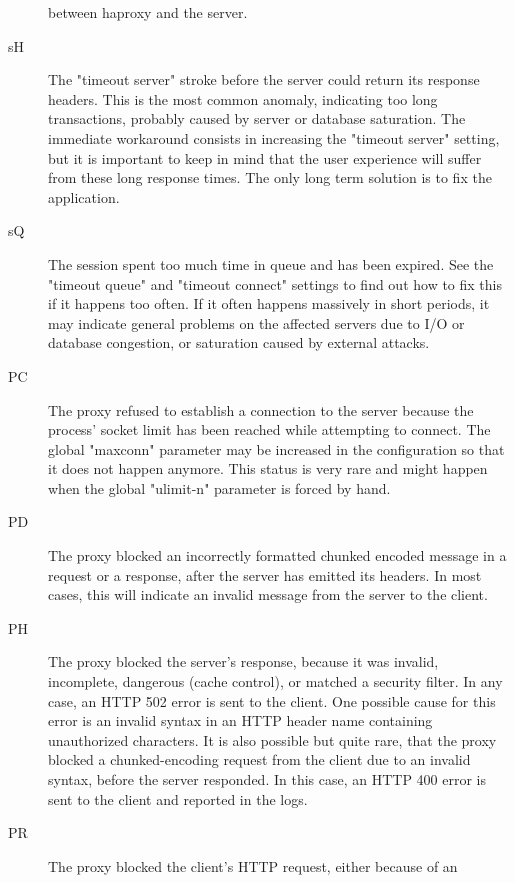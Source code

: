 \begin{description}
          between haproxy and the server.
     \item[sH]
          The "timeout server" stroke before the server could return its
          response headers. This is the most common anomaly, indicating too
          long transactions, probably caused by server or database saturation.
          The immediate workaround consists in increasing the "timeout server"
          setting, but it is important to keep in mind that the user experience
          will suffer from these long response times. The only long term
          solution is to fix the application.
     \item[sQ]
          The session spent too much time in queue and has been expired. See
          the "timeout queue" and "timeout connect" settings to find out how to
          fix this if it happens too often. If it often happens massively in
          short periods, it may indicate general problems on the affected
          servers due to I/O or database congestion, or saturation caused by
          external attacks.
     \item[PC]
          The proxy refused to establish a connection to the server because the
          process' socket limit has been reached while attempting to connect.
          The global "maxconn" parameter may be increased in the configuration
          so that it does not happen anymore. This status is very rare and
          might happen when the global "ulimit-n" parameter is forced by hand.
     \item[PD]
          The proxy blocked an incorrectly formatted chunked encoded message in
          a request or a response, after the server has emitted its headers. In
          most cases, this will indicate an invalid message from the server to
          the client.
     \item[PH]
          The proxy blocked the server's response, because it was invalid,
          incomplete, dangerous (cache control), or matched a security filter.
          In any case, an HTTP 502 error is sent to the client. One possible
          cause for this error is an invalid syntax in an HTTP header name
          containing unauthorized characters. It is also possible but quite
          rare, that the proxy blocked a chunked-encoding request from the
          client due to an invalid syntax, before the server responded. In this
          case, an HTTP 400 error is sent to the client and reported in the
          logs.
     \item[PR]
          The proxy blocked the client's HTTP request, either because of an

\end{description}
